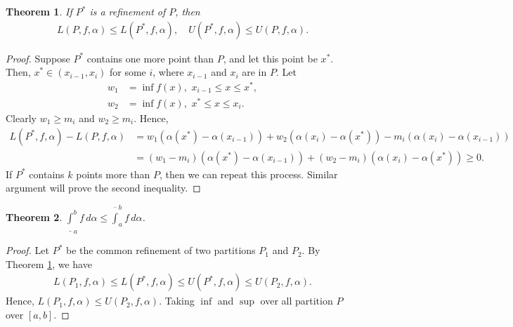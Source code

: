 \documentclass[11pt]{book}
\newtheorem{theorem}{Theorem}[chapter]
\theoremstyle{definition}
\numberwithin{equation}{chapter}
\begin{document}
\begin{theorem}\label{th_51}
If $P^*$ is a refinement of $P$, then 
\begin{align*}
    L(P,f,\alpha) \leq L(P^*,f,\alpha), \quad U(P^*,f,\alpha) \leq U(P,f,\alpha).
\end{align*}
\end{theorem}
\begin{proof}
Suppose $P^*$ contains one more point than $P$, and let this point be $x^*$. Then, $x^* \in (x_{i-1}, x_i)$ for some $i$, where $x_{i-1}$ and $x_i$ are in $P$. Let
\begin{align*}
    w_1 & = \inf f(x), \,\, x_{i-1} \leq x \leq x^*, \\
    w_2 & = \inf f(x), \,\, x^* \leq x \leq x_{i}.
\end{align*}
Clearly $w_1 \geq m_i$ and $w_2 \geq m_i$. Hence,
\begin{align*}
    L(P^*,f,\alpha) - L(P,f,\alpha) & = w_1 \left(\alpha(x^*) - \alpha(x_{i-1})\right) + w_2 \left(\alpha(x_i) - \alpha(x^*)\right) - m_i \left(\alpha(x_i) - \alpha(x_{i-1})\right) \\
    & = (w_1 - m_i) \left(\alpha(x^*) - \alpha(x_{i-1})\right) + (w_2 - m_i) \left(\alpha(x_i) - \alpha(x^*)\right) \geq 0.
\end{align*}
If $P^*$ contains $k$ points more than $P$, then we can repeat this process. Similar argument will prove the second inequality.
\end{proof}

\medskip

\begin{theorem}
$\displaystyle \underline{\int}^b_a f \,d\alpha \leq \overline{\int}^b_a f \,d\alpha$.
\end{theorem}
\begin{proof}
Let $P^*$ be the common refinement of two partitions $P_1$ and $P_2$. By Theorem \ref{th_51}, we have
\begin{align*}
    L(P_1,f,\alpha) \leq L(P^*,f,\alpha) \leq U(P^*,f,\alpha) \leq U(P_2,f,\alpha).
\end{align*}
Hence, $L(P_1,f,\alpha) \leq U(P_2,f,\alpha)$. Taking $\inf$ and $\sup$ over all partition $P$ over $[a,b]$.
\end{proof}

\medskip
\end{document}
